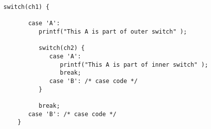 \begin{lstlisting}[style=CStyle]
    switch(ch1) {
    
       case 'A': 
          printf("This A is part of outer switch" );
    
          switch(ch2) {
             case 'A':
                printf("This A is part of inner switch" );
                break;
             case 'B': /* case code */
          }
    
          break;
       case 'B': /* case code */
    }
\end{lstlisting}